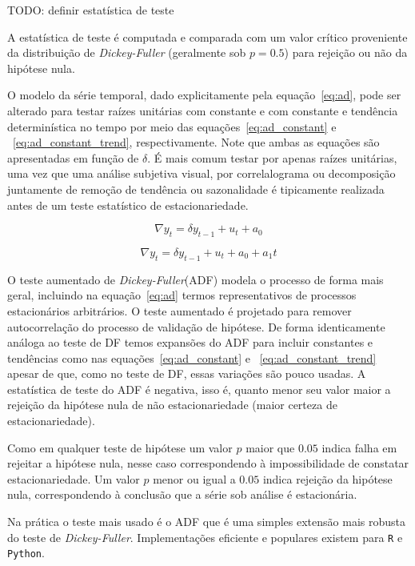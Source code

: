 TODO: definir estatística de teste

A estatística de teste é computada e comparada com um valor crítico proveniente
da distribuição de \emph{Dickey-Fuller} (geralmente sob $p=0.5$) para rejeição
ou não da hipótese nula.

O modelo da série temporal, dado explicitamente pela equação~\ref{eq:ad}, pode
ser alterado para testar raízes unitárias com constante e com constante e
tendência determinística no tempo por meio das equações~\ref{eq:ad_constant} e
~\ref{eq:ad_constant_trend}, respectivamente. Note que ambas as equações são
apresentadas em função de $\delta$. É mais comum testar por apenas raízes
unitárias, uma vez que uma análise subjetiva visual, por correlalograma ou
decomposição juntamente de remoção de tendência ou sazonalidade é tipicamente
realizada antes de um teste estatístico de estacionariedade.

\begin{equation}\label{eq:ad_constant}
    \nabla y_t = \delta y_{t-1} + u_t + a_0
\end{equation}

\begin{equation}\label{eq:ad_constant_trend}
    \nabla y_t = \delta y_{t-1} + u_t + a_0 + a_1 t
\end{equation}

O teste aumentado de \emph{Dickey-Fuller}(ADF) modela o processo de forma mais
geral, incluindo na equação~\ref{eq:ad} termos representativos de processos
estacionários arbitrários. O teste aumentado é projetado para remover
autocorrelação do processo de validação de hipótese. De forma identicamente
análoga ao teste de DF temos expansões do ADF para incluir constantes e
tendências como nas equações~\ref{eq:ad_constant} e
~\ref{eq:ad_constant_trend} apesar de que, como no teste de DF, essas
variações são pouco usadas. A estatística de teste do ADF é negativa, isso é,
quanto menor seu valor maior a rejeição da hipótese nula de não
estacionariedade (maior certeza de estacionariedade).

Como em qualquer teste de hipótese um valor $p$ maior que $0.05$ indica falha
em rejeitar a hipótese nula, nesse caso correspondendo à impossibilidade de
constatar estacionariedade. Um valor $p$ menor ou igual a $0.05$ indica
rejeição da hipótese nula, correspondendo à conclusão que a série sob análise
é estacionária.

Na prática o teste mais usado é o ADF que é uma simples extensão mais robusta
do teste de \emph{Dickey-Fuller}. Implementações eficiente e populares existem
para \verb+R+ e \verb+Python+.

